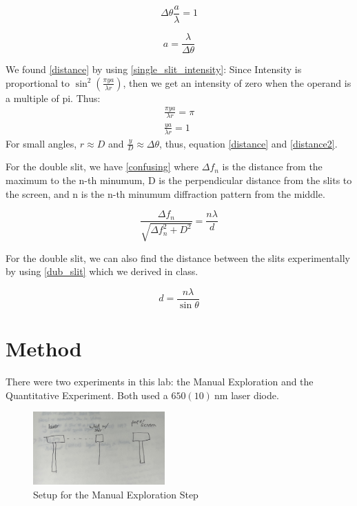 \documentclass{article}[12pt]
\begin{document}
\begin{equation}
  \Delta \theta \frac{a}{\lambda } = 1
  \label{distance}
\end{equation}

\begin{equation}
  a = \frac{\lambda }{\Delta \theta }
  \label{distance2}
\end{equation}

We found \eqref{distance} by using \eqref{single_slit_intensity}:
Since Intensity is proportional to $ \sin ^2(\frac{\pi y a}{\lambda r}) $, then we get an intensity of zero when the operand is a multiple of pi.
Thus:
\begin{gather*}
  \frac{\pi y a}{\lambda r} = \pi  \\
  \frac{y a}{\lambda  r} = 1
\end{gather*}
For small angles, $ r \approx D $ and $ \frac{y}{D} \approx \Delta \theta $, thus, equation \eqref{distance} and \eqref{distance2}.

For the double slit, we have \eqref{confusing} where $ \Delta  f_n $ is the distance from the maximum to the n-th minumum, D is the perpendicular distance from the slits to the screen, and n is the n-th minumum diffraction pattern from the middle.

\begin{equation}
  \frac{\Delta  f_n}{\sqrt{\Delta f^2_n+D^2} } = \frac{n \lambda }{d} 
  \label{confusing}
\end{equation}

For the double slit, we can also find the distance between the slits experimentally by using \eqref{dub_slit} which we derived in class.

\begin{equation}
  d = \frac{n \lambda }{\sin \theta }
  \label {dub_slit}
\end{equation}

\section{Method}

There were two experiments in this lab: the Manual Exploration and the Quantitative Experiment.
Both used a $ 650(10)~\mathrm{nm} $ laser diode.

\begin{figure}
  \center
  \includegraphics[width=0.45\textwidth]{figures/qual_exp.jpeg}
  \caption{Setup for the Manual Exploration Step}
\end{figure}
\end{document}

